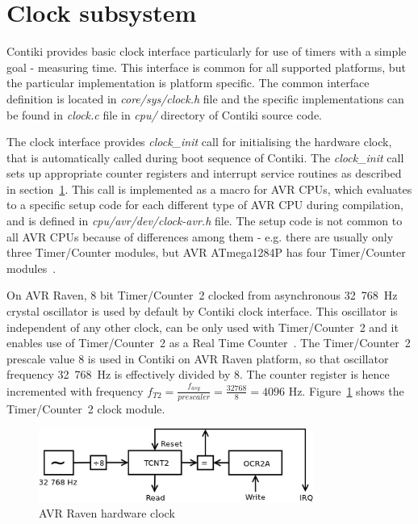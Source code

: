 
\section{Clock subsystem}\label{sec:analysis-clock}
Contiki provides basic clock interface particularly for use of timers
with a simple goal - measuring time.
This interface is common for all supported platforms,
but the particular implementation is platform specific.
The common interface definition is located in {\it{core/sys/clock.h}} file
and the specific implementations can be found in {\it{clock.c}} file
in {\it{cpu/}} directory of Contiki source code.

The clock interface provides {\it{clock\_init}} call for initialising the hardware clock,
that is automatically called during boot sequence of Contiki.
The {\it{clock\_init}} call sets up
appropriate counter registers and interrupt service routines as described in section~\ref{sec:analysis-clock}.
This call is implemented as a macro for AVR CPUs, which evaluates to a specific setup code for each
different type of AVR CPU during compilation, and is defined in {\it{cpu/avr/dev/clock-avr.h}} file.
The setup code is not common to all AVR CPUs because of differences among them - e.g. there are usually
only three Timer/Counter modules, but AVR ATmega1284P has four Timer/Counter modules~\cite{avr-datasheet}.

On AVR Raven, 8 bit Timer/Counter~2 clocked from asynchronous 32~768~Hz crystal oscillator
is used by default by Contiki clock interface.
This oscillator is independent of any other clock,
can be only used with Timer/Counter~2 and it
enables use of Timer/Counter~2 as a Real Time Counter~\cite{avr-datasheet}.
The Timer/Counter~2 prescale value 8 is used in Contiki on AVR Raven platform,
so that oscillator frequency 32~768~Hz is effectively divided by 8.
The counter register is hence incremented with frequency
$f_{T2} = {\frac{f_{asy}}{prescaler}} = {\frac{32768}{8}} = 4096$ Hz.
Figure~\ref{fig:avr-clock} shows the Timer/Counter~2 clock module.
\begin{figure}
  \centering
  \includegraphics[width=9cm,keepaspectratio]{fig/avr-clock.png}
  \caption{AVR Raven hardware clock}
  \label{fig:avr-clock}
\end{figure}

